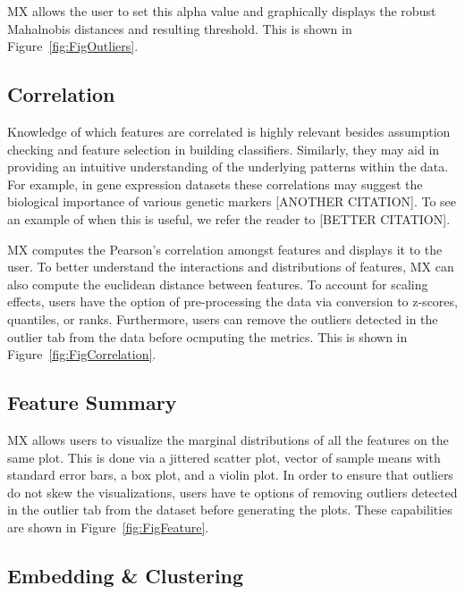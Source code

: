 \documentclass[12pt]{article}
\begin{document}
MX allows the user to set this alpha value and graphically displays the robust Mahalnobis distances and resulting threshold. This is shown in Figure~\ref{fig:FigOutliers}.

\subsection{Correlation}
\label{subsec:SubSecCorrelation}

Knowledge of which features are correlated is highly relevant besides assumption checking and feature selection in building classifiers. Similarly, they may aid in providing an intuitive understanding of the underlying patterns within the data. For example, in gene expression datasets these correlations may suggest the biological importance of various genetic markers [ANOTHER CITATION]. To see an example of when this is useful, we refer the reader to \cite{shi2012unsupervised} [BETTER CITATION].

MX computes the Pearson's correlation amongst features and displays it to the user. To better understand the interactions and distributions of features, MX can also compute the euclidean distance between features. To account for scaling effects, users have the option of pre-processing the data via conversion to z-scores, quantiles, or ranks. Furthermore, users can remove the outliers detected in the outlier tab from the data before ocmputing the metrics. This is shown in Figure~\ref{fig:FigCorrelation}.

\subsection{Feature Summary}
\label{subsec:SubSecFeature}

MX allows users to visualize the marginal distributions of all the features on the same plot. This is done via a jittered scatter plot, vector of sample means with standard error bars, a box plot, and a violin plot. In order to ensure that outliers do not skew the visualizations, users have te options of removing outliers detected in the outlier tab from the dataset before generating the plots. These capabilities are shown in  Figure~\ref{fig:FigFeature}.

\subsection{Embedding \& Clustering}
\label{subsec:SubSecEmbedding}
\end{document}
